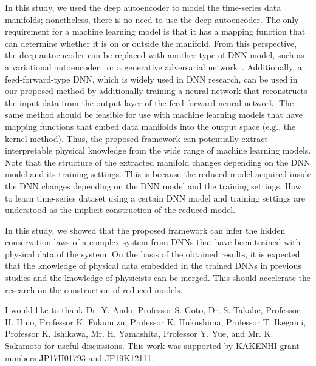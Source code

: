 \documentclass[preprint,
bibnotes,
 amsmath,amssymb,
 aps,
]{revtex4-1}
\newcounter{num}
\begin{document}
In this study, we used the deep autoencoder to model the time-series data manifolds; nonetheless, there is no need to use the deep autoencoder. The only requirement for a machine learning model is that it has a mapping function that can determine whether it is on or outside the manifold. From this perspective, the deep autoencoder can be replaced with another type of DNN model, such as a variational autoencoder~\cite{kingma2013auto} or a generative adversarial network~\cite{goodfellow2014generative}. 
Additionally, a feed-forward-type DNN, which is widely used in DNN research, can be used in our proposed method by additionally training a neural network that reconstructs the input data from the output layer of the feed forward neural network. The same method should be feasible for use with machine learning models that have mapping functions that embed data manifolds into the output space (e.g., the kernel method). Thus, the proposed framework can potentially extract interpretable physical knowledge from the wide range of machine learning models. 
Note that the structure of the extracted manifold changes depending on the DNN model and its training settings. 
This is because the reduced model acquired inside the DNN changes depending on the DNN model and the training settings. How to learn time-series dataset using a certain DNN model and training settings are understood as the implicit construction of the reduced model.\par
In this study, we showed that the proposed framework can infer the hidden conservation laws of a complex system from DNNs that have been trained with physical data of the system. 
On the basis of the obtained results, it is expected that the knowledge of physical data embedded in the trained DNNs in previous studies and the knowledge of physicists can be merged. This should accelerate the research on the construction of reduced models. 

\begin{acknowledgements}
I would like to thank Dr. Y. Ando, Professor S. Goto, Dr. S. Takabe, Professor H. Hino, Professor K. Fukumizu, Professor K. Hukushima, Professor T. Ikegami, Professor K. Ishikawa, Mr. H. Yamashita, Professor Y. Yue, and Mr. K. Sakamoto for useful discussions. This work was supported by KAKENHI grant numbers JP17H01793 and JP19K12111. 
\end{acknowledgements}

\appendix
\end{document}
